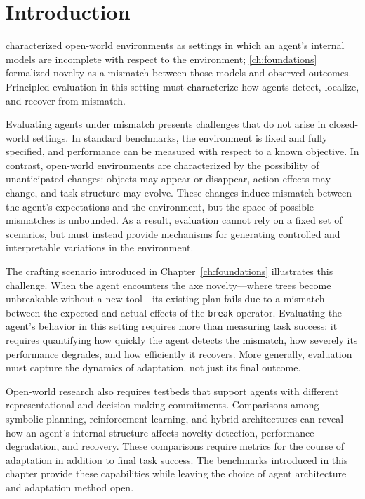 \section{Introduction}
\label{sec:benchmarks_motivation}

 characterized open-world environments as settings in which an agent's internal models are incomplete with respect to the environment; \cref{ch:foundations} formalized novelty as a mismatch between those models and observed outcomes. Principled evaluation in this setting must characterize how agents detect, localize, and recover from mismatch.

Evaluating agents under mismatch presents challenges that do not arise in closed-world settings. In standard benchmarks, the environment is fixed and fully specified, and performance can be measured with respect to a known objective. In contrast, open-world environments are characterized by the possibility of unanticipated changes: objects may appear or disappear, action effects may change, and task structure may evolve. These changes induce mismatch between the agent's expectations and the environment, but the space of possible mismatches is unbounded. As a result, evaluation cannot rely on a fixed set of scenarios, but must instead provide mechanisms for generating controlled and interpretable variations in the environment.

The crafting scenario introduced in Chapter~\ref{ch:foundations} illustrates this challenge. When the agent encounters the axe novelty---where trees become unbreakable without a new tool---its existing plan fails due to a mismatch between the expected and actual effects of the \texttt{break} operator. Evaluating the agent's behavior in this setting requires more than measuring task success: it requires quantifying how quickly the agent detects the mismatch, how severely its performance degrades, and how efficiently it recovers. More generally, evaluation must capture the dynamics of adaptation, not just its final outcome.

Open-world research also requires testbeds that support agents with different representational and decision-making commitments. Comparisons among symbolic planning, reinforcement learning, and hybrid architectures can reveal how an agent's internal structure affects novelty detection, performance degradation, and recovery. These comparisons require metrics for the course of adaptation in addition to final task success. The benchmarks introduced in this chapter provide these capabilities while leaving the choice of agent architecture and adaptation method open.

